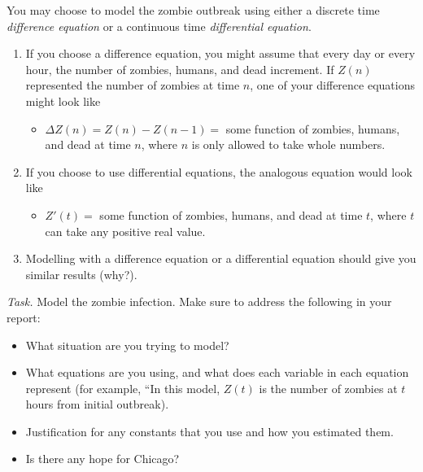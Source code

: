 
\begin{graybox}
You may choose to model the zombie outbreak using either a discrete time \emph{difference equation} or a continuous time \emph{differential equation}.
	\begin{enumerate}[label=\emph{(\alph*)}]
		\item If you choose a difference equation, you might assume that every day or every hour, the number of zombies, humans, and dead increment.  If $Z(n)$ represented the number of zombies at time $n$, one of your difference equations might look like
\begin{itemize}
	\item $\Delta Z(n) = Z(n) - Z(n-1) =$ some function of zombies, humans, and dead at time $n$,
	where $n$ is only allowed to take whole numbers.
\end{itemize}

	\item If you choose to use differential equations, the analogous equation would look like
\begin{itemize}
	\item $	Z'(t) = $ some function of zombies, humans, and dead at time $t$,
	where $t$ can take any positive real value.  
\end{itemize}

	\item Modelling with a difference equation or a differential equation should give you similar results (why?).
	\end{enumerate}
	
\end{graybox}

\emph{Task.} Model the zombie infection. Make sure to address the following in your report:
	\begin{itemize}
		\item What situation are you trying to model?
		\item What equations are you using, and what does each variable in each equation represent
			(for example, ``In this model, $Z(t)$ is the number of zombies at $t$ hours from initial outbreak).
		\item Justification for any constants that you use and how you estimated them.
		\item Is there any hope for Chicago?
	\end{itemize}

